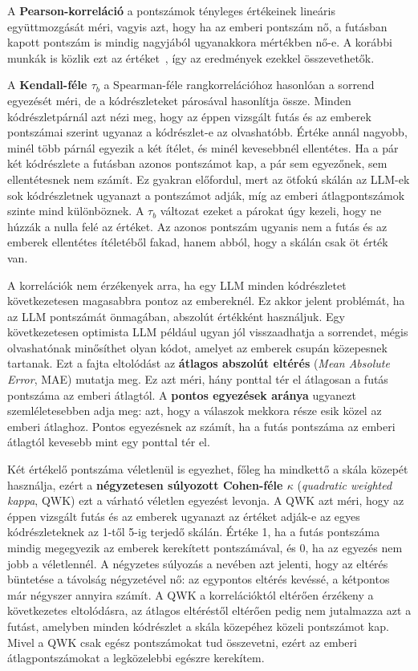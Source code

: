 \documentclass[
]{elteikthesis}[2024/04/26]
\begin{document}
A \textbf{Pearson-korreláció} a pontszámok tényleges értékeinek lineáris
együttmozgását méri, vagyis azt, hogy ha az emberi pontszám nő, a futásban
kapott pontszám is mindig nagyjából ugyanakkora mértékben nő-e. A korábbi munkák
is közlik ezt az értéket~\cite{buse2010learning,ouedraogo2025coreeval}, így az
eredmények ezekkel összevethetők.

A \textbf{Kendall-féle $\tau_b$} a Spearman-féle rangkorrelációhoz hasonlóan a
sorrend egyezését méri, de a kódrészleteket párosával hasonlítja össze. Minden
kódrészletpárnál azt nézi meg, hogy az éppen vizsgált futás és az emberek
pontszámai szerint ugyanaz a kódrészlet-e az olvashatóbb. Értéke annál nagyobb,
minél több párnál egyezik a két ítélet, és minél kevesebbnél ellentétes. Ha a
pár két kódrészlete a futásban azonos pontszámot kap, a pár sem egyezőnek, sem
ellentétesnek nem számít. Ez gyakran előfordul, mert az ötfokú skálán az LLM-ek
sok kódrészletnek ugyanazt a pontszámot adják, míg az emberi átlagpontszámok
szinte mind különböznek. A $\tau_b$ változat ezeket a párokat úgy kezeli, hogy
ne húzzák a nulla felé az értéket. Az azonos pontszám ugyanis nem a futás és az
emberek ellentétes ítéletéből fakad, hanem abból, hogy a skálán csak öt érték
van.

A korrelációk nem érzékenyek arra, ha egy LLM minden kódrészletet következetesen
magasabbra pontoz az embereknél. Ez akkor jelent problémát, ha az LLM pontszámát
önmagában, abszolút értékként használjuk. Egy következetesen optimista LLM
például ugyan jól visszaadhatja a sorrendet, mégis olvashatónak minősíthet olyan
kódot, amelyet az emberek csupán közepesnek tartanak. Ezt a fajta eltolódást az
\textbf{átlagos abszolút eltérés} (\textit{Mean Absolute Error}, MAE) mutatja
meg. Ez azt méri, hány ponttal tér el átlagosan a futás pontszáma az emberi
átlagtól. A \textbf{pontos egyezések aránya} ugyanezt szemléletesebben adja meg:
azt, hogy a válaszok mekkora része esik közel az emberi átlaghoz. Pontos
egyezésnek az számít, ha a futás pontszáma az emberi átlagtól kevesebb mint egy
ponttal tér el.

Két értékelő pontszáma véletlenül is egyezhet, főleg ha mindkettő a skála
közepét használja, ezért a \textbf{négyzetesen súlyozott Cohen-féle $\kappa$}
(\textit{quadratic weighted kappa}, QWK) ezt a várható véletlen egyezést
levonja. A QWK azt méri, hogy az éppen vizsgált futás és az emberek ugyanazt az
értéket adják-e az egyes kódrészleteknek az 1-től 5-ig terjedő skálán. Értéke 1,
ha a futás pontszáma mindig megegyezik az emberek kerekített pontszámával, és 0,
ha az egyezés nem jobb a véletlennél. A négyzetes súlyozás a nevében azt
jelenti, hogy az eltérés büntetése a távolság négyzetével nő: az egypontos
eltérés kevéssé, a kétpontos már négyszer annyira számít. A QWK a korrelációktól
eltérően érzékeny a következetes eltolódásra, az átlagos eltéréstől eltérően
pedig nem jutalmazza azt a futást, amelyben minden kódrészlet a skála közepéhez
közeli pontszámot kap. Mivel a QWK csak egész pontszámokat tud összevetni, ezért
az emberi átlagpontszámokat a legközelebbi egészre kerekítem.
\end{document}
